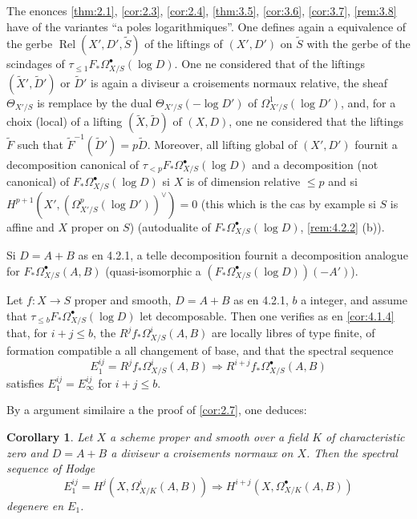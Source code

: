 \documentclass[12pt,a4paper]{article}
\theoremstyle{plain}
\newtheorem{corollary}[theorem]{Corollary}
\theoremstyle{definition}
\theoremstyle{remark}
\DeclareMathOperator{\Rel}{Rel}
\begin{document}
\subsubsection{}

The enonces \ref{thm:2.1}, \ref{cor:2.3}, \ref{cor:2.4}, \ref{thm:3.5}, \ref{cor:3.6}, \ref{cor:3.7}, \ref{rem:3.8} have of the variantes ``a poles logarithmiques''. One defines again a equivalence of the gerbe $\Rel(X', D', \tilde{S})$ of the liftings of $(X', D')$ on $\tilde{S}$ with the gerbe of the scindages of $\tau_{\le 1} F_* \Omega^{\bullet}_{X/S}(\log D)$. One ne considered that of the liftings $(\tilde{X}', \tilde{D}')$ or $\tilde{D}'$ is again a diviseur a croisements normaux relative, the sheaf $\Theta_{X'/S}$ is remplace by the dual $\Theta_{X'/S}(-\log D')$ of $\Omega^{1}_{X'/S}(\log D')$, and, for a choix (local) of a lifting $(\tilde{X}, \tilde{D})$ of $(X, D)$, one ne considered that the liftings $\tilde{F}$ such that $\tilde{F}^{-1}(\tilde{D}') = p\tilde{D}$. Moreover, all lifting global of $(X', D')$ fournit a decomposition canonical of $\tau_{<p} F_* \Omega^{\bullet}_{X/S}(\log D)$ and a decomposition (not canonical) of $F_* \Omega^{\bullet}_{X/S}(\log D)$ si $X$ is of dimension relative $\le p$ and si $H^{p+1}(X', (\Omega^p_{X'/S}(\log D'))^\vee) = 0$ (this which is the cas by example si $S$ is affine and $X$ proper on $S$) (autodualite of $F_* \Omega^{\bullet}_{X/S}(\log D)$, \ref{rem:4.2.2} (b)).

Si $D = A + B$ as en 4.2.1, a telle decomposition fournit a decomposition analogue for $F_* \Omega^{\bullet}_{X/S}(A, B)$ (quasi-isomorphic a $(F_* \Omega^{\bullet}_{X/S}(\log D))(-A')$).

Let $f: X \to S$ proper and smooth, $D = A + B$ as en 4.2.1, $b$ a integer, and assume that $\tau_{\le b} F_* \Omega^{\bullet}_{X/S}(\log D)$ let decomposable. Then one verifies as en \ref{cor:4.1.4} that, for $i + j \le b$, the $R^j f_* \Omega^i_{X/S}(A, B)$ are locally libres of type finite, of formation compatible a all changement of base, and that the spectral sequence
\[
E_1^{ij} = R^j f_* \Omega^i_{X/S}(A, B) \Rightarrow R^{i+j} f_* \Omega^{\bullet}_{X/S}(A, B)
\]
satisfies $E_1^{ij} = E_\infty^{ij}$ for $i + j \le b$.

By a argument similaire a the proof of \ref{cor:2.7}, one deduces:

\begin{corollary}\label{cor:4.2.4}
Let $X$ a scheme proper and smooth over a field $K$ of characteristic zero and $D = A + B$ a diviseur a croisements normaux on $X$. Then the spectral sequence of Hodge
\[
E_1^{ij} = H^j(X, \Omega^i_{X/K}(A, B)) \Rightarrow H^{i+j}(X, \Omega^{\bullet}_{X/K}(A, B))
\]
degenere en $E_1$.
\end{corollary}
\end{document}
